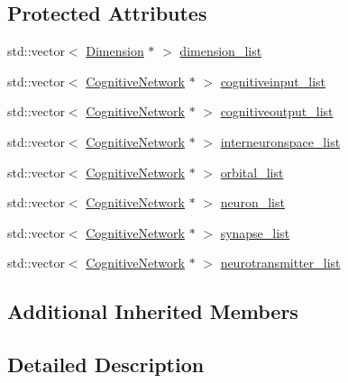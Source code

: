 \subsection*{Protected Attributes}
\begin{DoxyCompactItemize}
\item 
std\+::vector$<$ \mbox{\hyperlink{class_dimension}{Dimension}} $\ast$ $>$ \mbox{\hyperlink{class_cognitive_network_a79f0541fde6dd50f8e87f3f46d849b95}{dimension\+\_\+list}}
\item 
std\+::vector$<$ \mbox{\hyperlink{class_cognitive_network}{Cognitive\+Network}} $\ast$ $>$ \mbox{\hyperlink{class_cognitive_network_a5a46cefb188858fdc023df3abbac0a47}{cognitiveinput\+\_\+list}}
\item 
std\+::vector$<$ \mbox{\hyperlink{class_cognitive_network}{Cognitive\+Network}} $\ast$ $>$ \mbox{\hyperlink{class_cognitive_network_a7a57ad82736c0d8b03e7607b5c603b00}{cognitiveoutput\+\_\+list}}
\item 
std\+::vector$<$ \mbox{\hyperlink{class_cognitive_network}{Cognitive\+Network}} $\ast$ $>$ \mbox{\hyperlink{class_cognitive_network_aaf69f6e0cc0084eb748ef1540c773f85}{interneuronspace\+\_\+list}}
\item 
std\+::vector$<$ \mbox{\hyperlink{class_cognitive_network}{Cognitive\+Network}} $\ast$ $>$ \mbox{\hyperlink{class_cognitive_network_a263efd10857d5507c0e889e48f7329fe}{orbital\+\_\+list}}
\item 
std\+::vector$<$ \mbox{\hyperlink{class_cognitive_network}{Cognitive\+Network}} $\ast$ $>$ \mbox{\hyperlink{class_cognitive_network_abbb9ff97e1b9cd61602d95f44c30132e}{neuron\+\_\+list}}
\item 
std\+::vector$<$ \mbox{\hyperlink{class_cognitive_network}{Cognitive\+Network}} $\ast$ $>$ \mbox{\hyperlink{class_cognitive_network_a9218de9d63b10b313df289d1312c81e0}{synapse\+\_\+list}}
\item 
std\+::vector$<$ \mbox{\hyperlink{class_cognitive_network}{Cognitive\+Network}} $\ast$ $>$ \mbox{\hyperlink{class_cognitive_network_a7018bee3dbf538c3d0c81a64aa002ab8}{neurotransmitter\+\_\+list}}
\end{DoxyCompactItemize}
\subsection*{Additional Inherited Members}


\subsection{Detailed Description}


